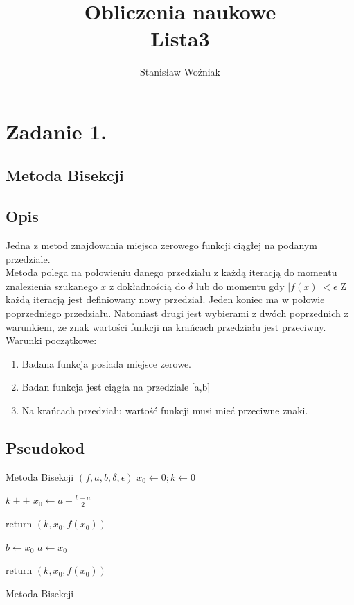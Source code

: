 \documentclass[11pt, a4paper]{article}
\title{Obliczenia naukowe\\Lista3}
\author{Stanisław Woźniak}
\date{}
\begin{document}
    \maketitle
    \section{Zadanie 1.}
    \subsection{Metoda Bisekcji}
    \subsection{Opis}
    Jedna z metod znajdowania miejsca zerowego funkcji ciągłej na podanym przedziale.\\
    Metoda polega na połowieniu danego przedziału z każdą iteracją do momentu znalezienia szukanego $x$ z dokładnością do $\delta$ lub do momentu gdy $|f(x)| < \epsilon$
    Z każdą iteracją jest definiowany nowy przedział. Jeden koniec ma w połowie poprzedniego przedziału. Natomiast drugi jest wybierami z dwóch poprzednich z warunkiem, że znak wartości funkcji na krańcach przedziału jest przeciwny.\\
    Warunki początkowe:
    \begin{enumerate}
        \item Badana funkcja posiada miejsce zerowe.
        \item Badan funkcja jest ciągła na przedziale [a,b]
        \item Na krańcach przedziału wartość funkcji musi mieć przeciwne znaki.
    \end{enumerate}
    \subsection{Pseudokod}
    \begin{algorithm}[H]

        \underline{Metoda Bisekcji} $(f, a,b, \delta,\epsilon)$\;
        $x_{0} \leftarrow 0;k \leftarrow 0$\;
        {
            $k++$\;
            {
                $x_{0} \leftarrow a + \frac{b-a}{2}$\;
            }

            {
                return $(k, x_{0}, f(x_{0}))$\;
            }

            {
                $b \leftarrow x_{0}$\;
            }
            {
                $a \leftarrow x_{0}$\;
            }
        }
        return $(k, x_{0}, f(x_{0}))$\;
        \caption{Metoda Bisekcji}
    \end{algorithm}
    
\end{document}
